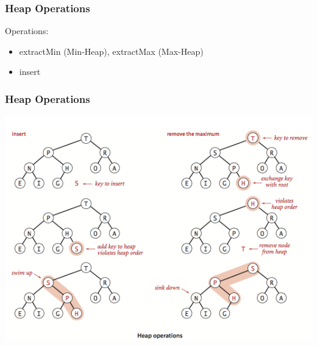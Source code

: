 \begin{frame}[fragile]
\frametitle{Heap Operations}
Operations:
\begin{itemize}
\item extractMin (Min-Heap), extractMax (Max-Heap)
\item insert
\end{itemize}
\end{frame}

\begin{frame}[fragile]
\frametitle{Heap Operations}
\includegraphics[scale=0.4]{img/heap-ops.png}\\
\end{frame}

